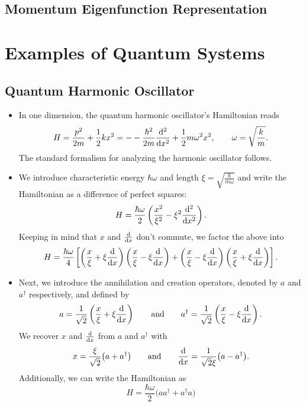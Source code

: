 \documentclass[11pt, a4paper]{article}
\newcommand{\eqtext}[1]{\qquad \text{#1} \qquad}
\begin{document}
\subsection{Momentum Eigenfunction Representation} 



\section{Examples of Quantum Systems}

\subsection{Quantum Harmonic Oscillator}
\begin{itemize}
	\item In one dimension, the quantum harmonic oscillator's Hamiltonian reads
	\begin{equation*}
		H = \frac{p^{2}}{2m} + \frac{1}{2}kx^{2} = - -\frac{\hbar^{2}}{2m}\dv[2]{}{x} + \frac{1}{2}m \omega^{2}x^{2}, \qquad \omega = \sqrt{\frac{k}{m}}.
	\end{equation*}
	The standard formalism for analyzing the harmonic oscillator follows.
	
	\item We introduce characteristic energy $ \hbar \omega $ and length $ \xi = \sqrt{\frac{\hbar}{m\omega}}$  and write the Hamiltonian as a difference of perfect squares:
	\begin{equation*}
		H = \frac{\hbar \omega}{2}\left(\frac{x^{2}}{\xi^{2}} - \xi^{2} \dv[2]{}{x}\right).
	\end{equation*}
	Keeping in mind that $ x $ and $ \dv{x} $ don't commute, we factor the above into
	\begin{equation*}
		H = \frac{\hbar \omega}{4}\left[\left(\frac{x}{\xi} + \xi \dv{x}\right)\left(\frac{x}{\xi} - \xi \dv{x}\right) + \left(\frac{x}{\xi} - \xi \dv{x}\right)\left(\frac{x}{\xi} + \xi \dv{x}\right)\right].
	\end{equation*}
	
	\item Next, we introduce the annihilation and creation operators, denoted by $ a $  and $ a^{\dagger} $ respectively, and defined by
	\begin{equation*}
		a = \frac{1}{\sqrt{2}}\left(\frac{x}{\xi} + \xi \dv{x}\right) \eqtext{and} a^{\dagger} = \frac{1}{\sqrt{2}}\left(\frac{x}{\xi} - \xi \dv{x}\right). 
	\end{equation*} 
	We recover $ x $ and $ \dv{x} $ from $ a $ and $ a^{\dagger} $ with
	\begin{equation*}
		x = \frac{\xi}{\sqrt{2}}\big(a + a^{\dagger}\big) \eqtext{and} \dv{x} = \frac{1}{\sqrt{2}\xi}\big(a - a^{\dagger}\big). 
	\end{equation*}
	Additionally, we can write the Hamiltonian as
	\begin{equation*}
		H = \frac{\hbar\omega}{2}\big(a a^{\dagger} + a^{\dagger}a\big)
	\end{equation*}
	

\end{itemize}
\end{document}

